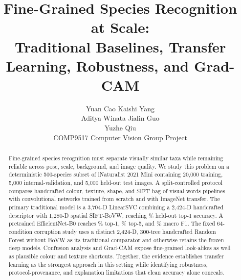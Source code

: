 \documentclass[10pt,twocolumn,letterpaper]{article}
\title{Fine-Grained Species Recognition at Scale:\\
Traditional Baselines, Transfer Learning, Robustness, and Grad-CAM}
\author{
Yuan Cao \quad
Kaishi Yang\\
Aditya Winata \quad
Jialin Guo\\
Yuzhe Qiu\\
COMP9517 Computer Vision Group Project
}
\begin{document}
\maketitle


\begin{abstract}
Fine-grained species recognition must separate visually similar taxa while
remaining reliable across pose, scale, background, and image quality.  We
study this problem on a deterministic 500-species subset of iNaturalist 2021
Mini containing 20,000 training, 5,000 internal-validation, and 5,000 held-out
test images.  A split-controlled protocol compares handcrafted colour, texture,
shape, and SIFT bag-of-visual-words pipelines with convolutional networks
trained from scratch and with ImageNet transfer.  The primary traditional
model is a 3,704-D LinearSVC combining a 2,424-D handcrafted descriptor with
1,280-D spatial SIFT-BoVW, reaching
\PrimaryTraditionalTestTopOnePercent\% held-out top-1 accuracy.  A pretrained
EfficientNet-B0 reaches \BestTestTopOnePercent\% top-1,
\BestTestTopFivePercent\% top-5, and \BestTestMacroFOnePercent\% macro F1.
The fixed 64-condition corruption study uses a distinct 2,424-D, 300-tree
handcrafted Random Forest without BoVW as its traditional comparator and
otherwise retains the frozen deep models.  Confusion analysis and Grad-CAM
expose fine-grained look-alikes as well as plausible colour and texture
shortcuts.  Together, the evidence establishes transfer learning as the
strongest approach in this setting while identifying robustness,
protocol-provenance, and explanation limitations that clean accuracy alone
conceals.
\end{abstract}










\FloatBarrier
\label{LastPageMainText}
\clearpage
{\small


}
\end{document}
